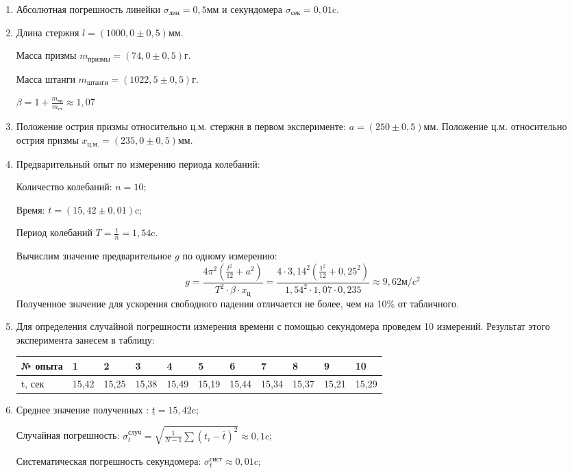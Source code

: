 \documentclass[a4paper,12pt]{article} %
\begin{document}
\begin{enumerate}
\item Абсолютная погрешность линейки $\sigma_{лин}=0,5$мм и секундомера $\sigma_{сек}=0,01$c.

\item Длина стержня $l=(1000,0 \pm 0,5)$мм.

Масса призмы $m_{призмы}= (74,0 \pm0,5)$г.

Масса штанги $m_{штанги} = (1022,5 \pm 0,5)$г.

$\beta = 1 + \frac{m_{пр}}{m_{ст}}\approx 1,07$

\item Положение острия призмы относительно ц.м. стержня в первом эксперименте: $a=(250\pm0,5)$мм.
Положение ц.м. относительно острия призмы $x_{ц.м.} = (235,0\pm 0,5)$мм.
\item Предварительный опыт по измерению периода колебаний:

Количество колебаний: $n=10$;

Время: $t = (15,42 \pm 0,01)$c;

Период колебаний $T=\frac{t}{n}=1,54$c.

Вычислим значение предварительное $g$ по одному измерению:
\[g=\frac{4\pi^2(\frac{l^2}{12}+a^2)}{T^2\cdot \beta \cdot x_ц}= \frac{4\cdot3,14^2(\frac{1^2}{12}+0,25^2)}{1,54^2 \cdot 1,07 \cdot 0,235} \approx9,62  м/c^2\]
Полученное значение для ускорения свободного падения отличается не более, чем на 10\% от табличного.

\item Для определения случайной погрешности измерения времени с помощью секундомера проведем 10 измерений. Результат этого эксперимента занесем в таблицу:

    \begin{tabular}{l|llllllllll}
    № опыта & 1     & 2     & 3     & 4     & 5     & 6     & 7     & 8     & 9     & 10    \\ \hline
    t, сек  & 15,42 & 15,25 & 15,38 & 15,49 & 15,19 & 15,44 & 15,34 & 15,37 & 15,21 & 15,29 \\
    \end{tabular}

\item Среднее значение полученных : $\underline{t} = 15,42$c;

Случайная погрешность: $\sigma^{случ}_t=\sqrt{\frac{1}{N-1} \sum(t_i-\overline{t})^2} \approx 0,1c$;

Систематическая погрешность секундомера: $\sigma^{сист}_{t}\approx 0,01c$;


\end{enumerate}
\end{document}
